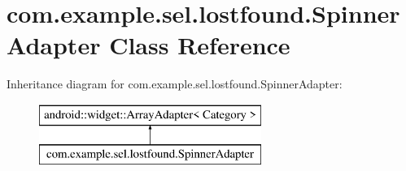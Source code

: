 \hypertarget{classcom_1_1example_1_1sel_1_1lostfound_1_1SpinnerAdapter}{\section{com.\-example.\-sel.\-lostfound.\-Spinner\-Adapter Class Reference}
\label{classcom_1_1example_1_1sel_1_1lostfound_1_1SpinnerAdapter}
}
Inheritance diagram for com.\-example.\-sel.\-lostfound.\-Spinner\-Adapter\-:\begin{figure}[H]
\begin{center}
\leavevmode
\includegraphics[height=2.000000cm]{classcom_1_1example_1_1sel_1_1lostfound_1_1SpinnerAdapter}
\end{center}
\end{figure}
